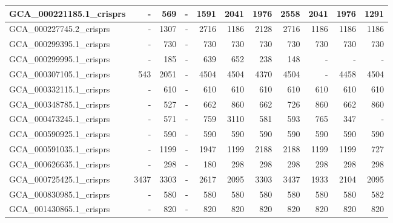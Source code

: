 \documentclass[12pt,a4paper]{article}
\begin{document}
\begin{table}[ht]
\begin{center}
\begin{tabular}{|l*{10}{|r}|}
GCA\_000221185.1\_crisprs & - & 569 & - & 1591 & 2041 & 1976 & 2558 & 2041 & 1976 & 1291 \\ \hline
GCA\_000227745.2\_crisprs & - & 1307 & - & 2716 & 1186 & 2128 & 2716 & 1186 & 1186 & 1186 \\ \hline
GCA\_000299395.1\_crisprs & - & 730 & - & 730 & 730 & 730 & 730 & 730 & 730 & 730 \\ \hline
GCA\_000299995.1\_crisprs & - & 185 & - & 639 & 652 & 238 & 148 & - & - & - \\ \hline
GCA\_000307105.1\_crisprs & 543 & 2051 & - & 4504 & 4504 & 4370 & 4504 & - & 4458 & 4504 \\ \hline
GCA\_000332115.1\_crisprs & - & 610 & - & 610 & 610 & 610 & 610 & 610 & 610 & 610 \\ \hline
GCA\_000348785.1\_crisprs & - & 527 & - & 662 & 860 & 662 & 726 & 860 & 662 & 860 \\ \hline
GCA\_000473245.1\_crisprs & - & 571 & - & 759 & 3110 & 581 & 593 & 765 & 347 & - \\ \hline
GCA\_000590925.1\_crisprs & - & 590 & - & 590 & 590 & 590 & 590 & 590 & 590 & 590 \\ \hline
GCA\_000591035.1\_crisprs & - & 1199 & - & 1947 & 1199 & 2188 & 2188 & 1199 & 1199 & 727 \\ \hline
GCA\_000626635.1\_crisprs & - & 298 & - & 180 & 298 & 298 & 298 & 298 & 298 & 298 \\ \hline
GCA\_000725425.1\_crisprs & 3437 & 3303 & - & 2617 & 2095 & 3303 & 3437 & 1933 & 2104 & 2095 \\ \hline
GCA\_000830985.1\_crisprs & - & 580 & - & 580 & 580 & 580 & 580 & 580 & 580 & 582 \\ \hline
GCA\_001430865.1\_crisprs & - & 820 & - & 820 & 820 & 820 & 820 & 820 & 820 & 820 \\ \hline
\end{tabular}
\end{center}
\end{table}
\end{document}
